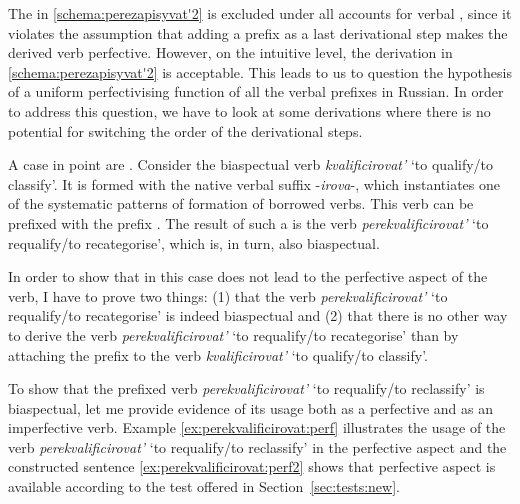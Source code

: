 The  in \ref{schema:perezapisyvat'2} is excluded under all accounts for verbal , since it violates the assumption that adding a prefix as a last derivational step makes the derived verb perfective. However, on the intuitive level, the derivation in \ref{schema:perezapisyvat'2} is acceptable. This leads to us to question the hypothesis of a uniform perfectivising function of all the verbal prefixes in Russian. In order to address this question, we have to look at some derivations where there is no potential for switching the order of the derivational steps.

A case in point are . Consider the biaspectual verb \textit{kvalificirovat'} `to qualify/to classify'. It is formed with the native verbal suffix -\textit{irova}-, which instantiates one of the systematic patterns of formation of borrowed verbs. This verb can be prefixed with the  prefix . The result of such a  is the verb \textit{perekvalificirovat'} `to requalify/to recategorise', which is, in turn, also biaspectual.

In order to show that in this case  does not lead to the perfective aspect of the verb, I have to prove two things: (1) that the verb \textit{perekvalificirovat'} `to requalify/to recategorise' is indeed biaspectual and (2) that there is no other way to derive the verb \textit{perekvalificirovat'} `to requalify/to recategorise' than by attaching the prefix  to the verb \textit{kvalificirovat'} `to qualify/to classify'.

To show that the prefixed verb \textit{perekvalificirovat'} `to requalify/to reclassify' is  biaspectual, let me provide evidence of its usage both as a perfective and as an imperfective verb. Example \ref{ex:perekvalificirovat:perf} illustrates the usage of the verb \textit{perekvalificirovat'} `to requalify/to reclassify' in the perfective aspect and the constructed sentence \ref{ex:perekvalificirovat:perf2} shows that perfective aspect is available according to the test offered in Section~\ref{sec:tests:new}.

